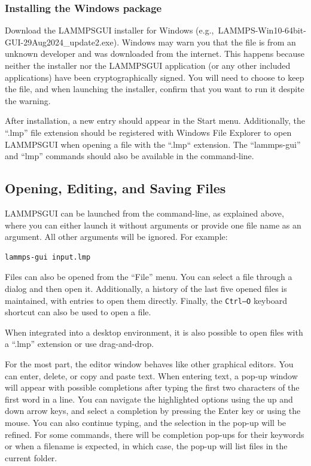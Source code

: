 \documentclass[9pt,tutorial]{livecoms}
\newcommand{\lammpsgui}{\textsf{LAMMPS\textendash GUI}}
\begin{document}
\begin{appendices}
\subsubsection{Installing the Windows package}

Download the \lammpsgui{} installer for Windows
(e.g.,~LAMMPS-Win10-64bit-GUI-29Aug2024\_update2.exe).  Windows may warn
you that the file is from an unknown developer and was downloaded from
the internet.  This happens because neither the installer nor the
\lammpsgui{} application (or any other included applications) have been
cryptographically signed.  You will need to choose to keep the file, and
when launching the installer, confirm that you want to run it despite
the warning.

After installation, a new entry should appear in the Start menu.
Additionally, the ``.lmp'' file extension should be registered with
Windows File Explorer to open \lammpsgui{} when opening a file with the
``.lmp`` extension.  The ``lammps-gui'' and ``lmp'' commands should also
be available in the command-line.

\subsection{Opening, Editing, and Saving Files}

\lammpsgui{} can be launched from the command-line, as explained above, where you
can either launch it without arguments or provide one file name as an argument.  All
other arguments will be ignored.  For example:
\begin{lstlisting}[language=tcl]
lammps-gui input.lmp
\end{lstlisting}
Files can also be opened from the ``File'' menu.  You can select a
file through a dialog and then open it.  Additionally, a history of
the last five opened files is maintained, with entries to open them directly.
Finally, the \texttt{Ctrl--O} keyboard shortcut can also be used to open a file.

When integrated into a desktop environment, it is also possible to open
files with a ``.lmp'' extension or use drag-and-drop.

For the most part, the editor window behaves like other graphical
editors.  You can enter, delete, or copy and paste text.   When entering
text, a pop-up window will appear with possible completions after typing
the first two characters of the first word in a line.  You can
navigate the highlighted options using the up and down arrow keys, and select a
completion by pressing the Enter key or using the mouse.  You can also continue
typing, and the selection in the pop-up will be refined.  For some
commands, there will be completion pop-ups for their
keywords or when a filename is expected, in which case,
the pop-up will list files in the current folder.


\end{appendices}
\end{document}
